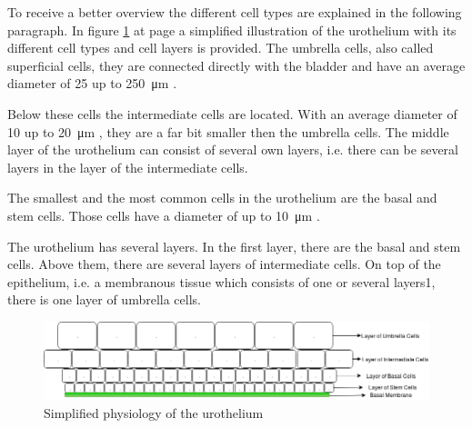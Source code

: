To receive a better overview the different cell types are explained in the following paragraph. In figure \ref{img:physiology_urothelium} at page \pageref{img:physiology_urothelium} a simplified illustration of the urothelium with its different cell types and cell layers is provided. \newline
The umbrella cells, also called superficial cells, they are connected directly with the bladder and have an average diameter of 25 up to \SI{250}{\micro\metre} \cite{Yamany2014, PuneetKhandelwal2009}. 

Below these cells the intermediate cells are located. With an average diameter of 10 up to \SI{20}{\micro\metre} \cite{Yamany2014, PuneetKhandelwal2009}, they are a far bit smaller then the umbrella cells. The middle layer of the urothelium can consist of several own layers, i.e. there can be several layers in the layer of the intermediate cells. 

The smallest and the most common cells in the urothelium are the basal and stem cells. Those cells have a diameter of up to \SI{10}{\micro\metre} \cite{Lazzeri2006, PuneetKhandelwal2009}. 

The urothelium has several layers. In the first layer, there are the basal and stem cells. Above them, there are several layers of intermediate cells. On top of the epithelium, i.e. a membranous tissue which consists of one or several layers1, there is one layer of umbrella cells.

\begin{figure}
	\center
	\includegraphics[scale=0.6]{figures/Urothelium.png}
	\caption{Simplified physiology of the urothelium}
	\label{img:physiology_urothelium}
\end{figure}

